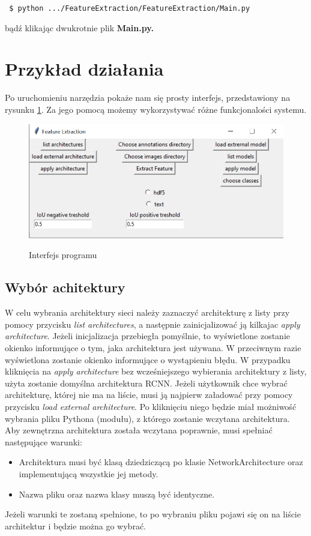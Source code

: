 \documentclass[a4paper,twoside,12pt]{book}
\begin{document}
{{\lstinline| $ python .../FeatureExtraction/FeatureExtraction/Main.py| }

{bądź klikając dwukrotnie plik \textbf{Main.py.}}
\section{Przykład działania}
{Po uruchomieniu narzędzia pokaże nam się prosty interfejs, przedstawiony na rysunku \ref{interface}. Za jego pomocą możemy wykorzystywać różne funkcjonalości systemu.}


\begin{figure}[h!]
\caption{Interfejs programu}

\centering
\includegraphics[scale=0.9]{interface.png}
\label{interface}
\end{figure}

\subsection{Wybór achitektury}
{W celu wybrania architektury sieci należy zaznaczyć architekturę z listy przy pomocy przycisku \emph{list architectures}, a następnie zainicjalizować ją kilkajac \emph{apply architecture}. Jeżeli inicjalizacja przebiegła pomyślnie, to wyświetlone zostanie okienko informujące o tym, jaka architektura jest używana. W przeciwnym razie wyświetlona zostanie okienko informujące o wystąpieniu błędu. W przypadku kliknięcia na \emph{apply architecture} bez wcześniejszego wybierania architektury z listy, użyta zostanie domyślna architektura RCNN. Jeżeli użytkownik chce wybrać architekturę, której nie ma na liście, musi ją najpierw załadować przy pomocy przycisku  \emph{load external architecture}. Po kliknięciu niego będzie miał możniwość wybrania pliku Pythona (modułu), z którego zostanie wczytana architektura. Aby zewnętrzna architektura została wczytana poprawnie, musi spełniać następujące warunki:
\begin{itemize}
\item Architektura musi być klasą dziedziczącą po klasie NetworkArchitecture oraz implementującą wszystkie jej metody.
\item Nazwa pliku oraz nazwa klasy muszą być identyczne.
\end{itemize}
Jeżeli warunki te zostaną spełnione, to po wybraniu pliku pojawi się on na liście architektur i będzie można go wybrać.}
}
\end{document}
